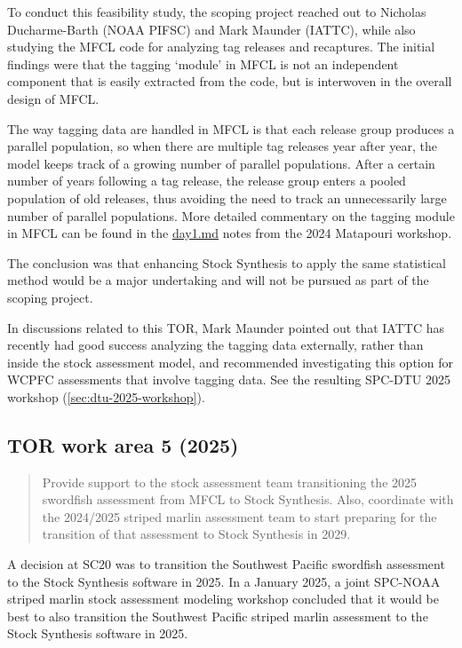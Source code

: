 \documentclass{SCreport}
\newcommand\blob
{https://github.com/PacificCommunity/ofp-sam-transition-plan/blob/main}
\begin{document}
To conduct this feasibility study, the scoping project reached out to Nicholas
Ducharme-Barth (NOAA PIFSC) and Mark Maunder (IATTC), while also studying the
MFCL code for analyzing tag releases and recaptures. The initial findings were
that the tagging `module' in MFCL is not an independent component that is easily
extracted from the code, but is interwoven in the overall design of MFCL.

The way tagging data are handled in MFCL is that each release group produces a
parallel population, so when there are multiple tag releases year after year,
the model keeps track of a growing number of parallel populations. After a
certain number of years following a tag release, the release group enters a
pooled population of old releases, thus avoiding the need to track an
unnecessarily large number of parallel populations. More detailed commentary on
the tagging module in MFCL can be found in the
\href{\blob/workshops/2024-08-matapouri/notes/day1.md}{day1.md} notes from the
2024 Matapouri workshop.

The conclusion was that enhancing Stock Synthesis to apply the same statistical
method would be a major undertaking and will not be pursued as part of the
scoping project.

In discussions related to this TOR, Mark Maunder pointed out that IATTC has
recently had good success analyzing the tagging data externally, rather than
inside the stock assessment model, and recommended investigating this option for
WCPFC assessments that involve tagging data. See the resulting SPC-DTU 2025
workshop (\autoref{sec:dtu-2025-workshop}).

\vspace{2ex}

\hypertarget{link:tor-5}{}
\subsection{TOR work area 5 (2025)}
\label{sec:tor-5}

\begin{quote}\sf
  Provide support to the stock assessment team transitioning the 2025 swordfish
  assessment from MFCL to Stock Synthesis. Also, coordinate with the 2024/2025
  striped marlin assessment team to start preparing for the transition of that
  assessment to Stock Synthesis in 2029.
\end{quote}

\vspace{1ex}

A decision at SC20 was to transition the Southwest Pacific swordfish assessment
to the Stock Synthesis software in 2025. In a January 2025, a joint SPC-NOAA
striped marlin stock assessment modeling workshop concluded that it would be
best to also transition the Southwest Pacific striped marlin assessment to the
Stock Synthesis software in 2025.
\end{document}
